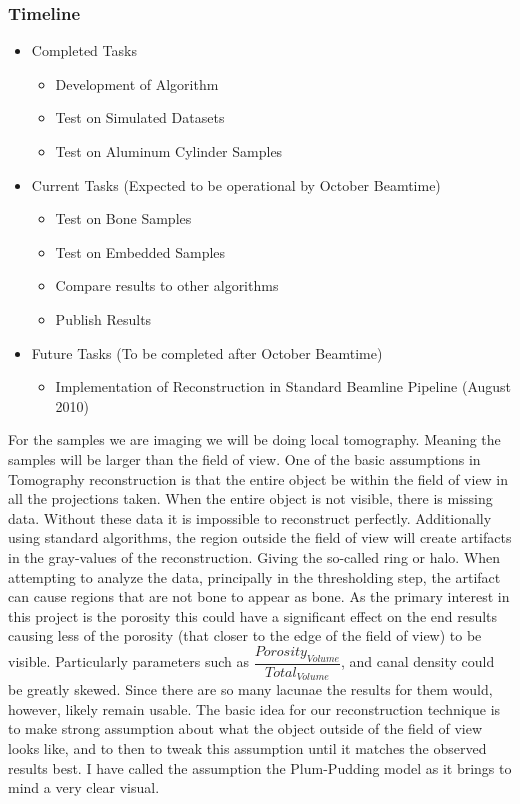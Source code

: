 \subsubsection*{Timeline}
\begin{itemize}
 	\item Completed Tasks
	\begin{itemize}
		\item Development of Algorithm
		\item Test on Simulated Datasets
		\item Test on Aluminum Cylinder Samples

	\end{itemize}
	\item Current Tasks (Expected to be operational by October Beamtime)
	\begin{itemize}
		\item Test on Bone Samples
		\item Test on Embedded Samples
		\item Compare results to other algorithms
		\item Publish Results
	\end{itemize}
	\item Future Tasks (To be completed after October Beamtime)
	\begin{itemize}
		\item Implementation of Reconstruction in Standard Beamline Pipeline (August 2010)
	\end{itemize}
\end{itemize}
For the samples we are imaging we will be doing local tomography. Meaning the samples will be larger than the field of view. One of the basic assumptions in Tomography reconstruction is that the entire object be within the field of view in all the projections taken. When the entire object is not visible, there is missing data. Without these data it is impossible to reconstruct perfectly. Additionally using standard algorithms, the region outside the field of view will create artifacts in the gray-values of the reconstruction. Giving the so-called ring or halo. When attempting to analyze the data, principally in the thresholding step, the artifact can cause regions that are not bone to appear as bone. As the primary interest in this project is the porosity this could have a significant effect on the end results causing less of the porosity (that closer to the edge of the field of view) to be visible. Particularly parameters such as $\dfrac{Porosity_{Volume}}{Total_{Volume}}$, and canal density could be greatly skewed. Since there are so many lacunae the results for them would, however, likely remain usable.
The basic idea for our reconstruction technique is to make strong assumption about what the object outside of the field of view looks like, and to then to tweak this assumption until it matches the observed results best. I have called the assumption the Plum-Pudding model as it brings to mind a very clear visual.

